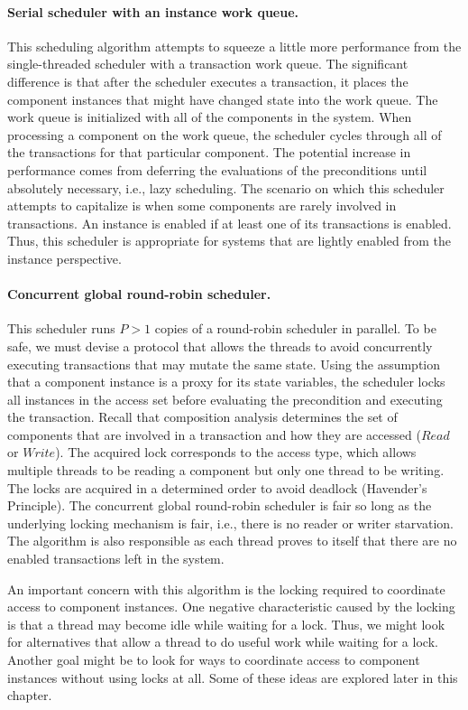 \paragraph{Serial scheduler with an instance work queue.}
This scheduling algorithm attempts to squeeze a little more performance from the single-threaded scheduler with a transaction work queue.
The significant difference is that after the scheduler executes a transaction, it places the component instances that might have changed state into the work queue.
The work queue is initialized with all of the components in the system.
When processing a component on the work queue, the scheduler cycles through all of the transactions for that particular component.
The potential increase in performance comes from deferring the evaluations of the preconditions until absolutely necessary, i.e., lazy scheduling.
The scenario on which this scheduler attempts to capitalize is when some components are rarely involved in transactions.
An instance is enabled if at least one of its transactions is enabled.
Thus, this scheduler is appropriate for systems that are lightly enabled from the instance perspective.

\paragraph{Concurrent global round-robin scheduler.}
This scheduler runs $P > 1$ copies of a round-robin scheduler in parallel.
To be safe, we must devise a protocol that allows the threads to avoid concurrently executing transactions that may mutate the same state.
Using the assumption that a component instance is a proxy for its state variables, the scheduler locks all instances in the access set before evaluating the precondition and executing the transaction.
Recall that composition analysis determines the set of components that are involved in a transaction and how they are accessed ($\mathit{Read}$ or $\mathit{Write}$).
The acquired lock corresponds to the access type, which allows multiple threads to be reading a component but only one thread to be writing.
The locks are acquired in a determined order to avoid deadlock (Havender's Principle).
The concurrent global round-robin scheduler is fair so long as the underlying locking mechanism is fair, i.e., there is no reader or writer starvation.
The algorithm is also responsible as each thread proves to itself that there are no enabled transactions left in the system.

An important concern with this algorithm is the locking required to coordinate access to component instances.
One negative characteristic caused by the locking is that a thread may become idle while waiting for a lock.
Thus, we might look for alternatives that allow a thread to do useful work while waiting for a lock.
Another goal might be to look for ways to coordinate access to component instances without using locks at all.
Some of these ideas are explored later in this chapter.

